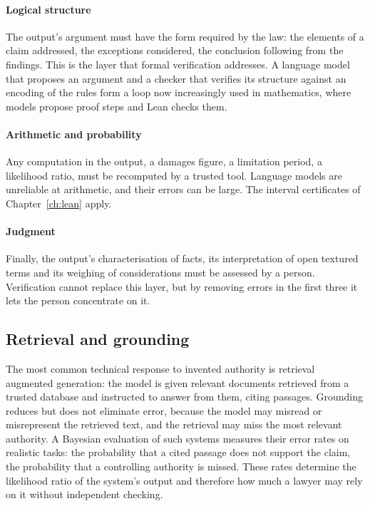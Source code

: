 \paragraph{Logical structure} The output's argument must have the form required by the law: the elements of a claim addressed, the exceptions considered, the conclusion following from the findings. This is the layer that formal verification addresses. A language model that proposes an argument and a checker that verifies its structure against an encoding of the rules form a loop now increasingly used in mathematics, where models propose proof steps and Lean checks them.

\paragraph{Arithmetic and probability} Any computation in the output, a damages figure, a limitation period, a likelihood ratio, must be recomputed by a trusted tool. Language models are unreliable at arithmetic, and their errors can be large. The interval certificates of Chapter~\ref{ch:lean} apply.

\paragraph{Judgment} Finally, the output's characterisation of facts, its interpretation of open textured terms and its weighing of considerations must be assessed by a person. Verification cannot replace this layer, but by removing errors in the first three it lets the person concentrate on it.

\subsection{Retrieval and grounding}

The most common technical response to invented authority is retrieval augmented generation: the model is given relevant documents retrieved from a trusted database and instructed to answer from them, citing passages. Grounding reduces but does not eliminate error, because the model may misread or misrepresent the retrieved text, and the retrieval may miss the most relevant authority. A Bayesian evaluation of such systems measures their error rates on realistic tasks: the probability that a cited passage does not support the claim, the probability that a controlling authority is missed. These rates determine the likelihood ratio of the system's output and therefore how much a lawyer may rely on it without independent checking.

